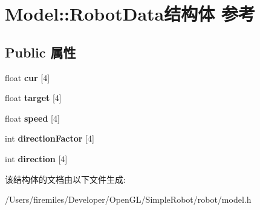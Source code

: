 \hypertarget{struct_model_1_1_robot_data}{}\section{Model\+:\+:Robot\+Data结构体 参考}
\label{struct_model_1_1_robot_data}
\subsection*{Public 属性}
\begin{DoxyCompactItemize}
\item 
\hypertarget{struct_model_1_1_robot_data_a0f2573c83b5bcf44922f64a2dd196e94}{}float {\bfseries cur} \mbox{[}4\mbox{]}\label{struct_model_1_1_robot_data_a0f2573c83b5bcf44922f64a2dd196e94}

\item 
\hypertarget{struct_model_1_1_robot_data_a2ac4a546457699acb676c36e016ae99a}{}float {\bfseries target} \mbox{[}4\mbox{]}\label{struct_model_1_1_robot_data_a2ac4a546457699acb676c36e016ae99a}

\item 
\hypertarget{struct_model_1_1_robot_data_a7f8c4b66fdf52ed11957d463a89c5862}{}float {\bfseries speed} \mbox{[}4\mbox{]}\label{struct_model_1_1_robot_data_a7f8c4b66fdf52ed11957d463a89c5862}

\item 
\hypertarget{struct_model_1_1_robot_data_a0d480a76f784c7a3b94094d56052c9e8}{}int {\bfseries direction\+Factor} \mbox{[}4\mbox{]}\label{struct_model_1_1_robot_data_a0d480a76f784c7a3b94094d56052c9e8}

\item 
\hypertarget{struct_model_1_1_robot_data_ad43165918af4aeced6ecac8fd8c25834}{}int {\bfseries direction} \mbox{[}4\mbox{]}\label{struct_model_1_1_robot_data_ad43165918af4aeced6ecac8fd8c25834}

\end{DoxyCompactItemize}


该结构体的文档由以下文件生成\+:\begin{DoxyCompactItemize}
\item 
/\+Users/firemiles/\+Developer/\+Open\+G\+L/\+Simple\+Robot/robot/model.\+h\end{DoxyCompactItemize}
